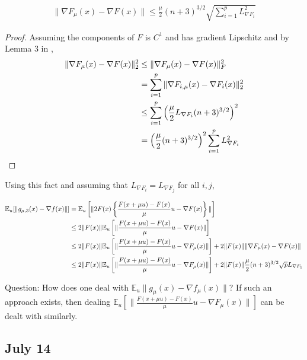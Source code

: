 \documentclass{article}
\begin{document}
\begin{theorem} \label{July_13_Theorem_grad_upper_bound}
\begin{align}
\|\nabla F_{\mu}(x) - \nabla F(x) \| \leq \frac{\mu}{2}(n+3)^{3/2}\sqrt{\sum_{i=1}^p L_{\nabla F_i}^2}
\end{align}
\begin{proof}
Assuming the components of $F$ is $C^1$ and has gradient Lipschitz and by Lemma $3$ in \cite{Nesterov2015},
\begin{align}
\|\nabla F_{\mu}(x) - \nabla F(x)\|_2^2 & \leq \|\nabla F_{\mu}(x) - \nabla F(x)\|_F^2 \notag \\ & = \sum_{i=1}^p \| \nabla F_{i,\mu}(x) - \nabla F_i(x)\|_2^2 \notag \\ & \leq \sum_{i=1}^p\left(\frac{\mu}{2}L_{\nabla F_i}(n+3)^{3/2}\right)^2 \notag \\ & = \left(\frac{\mu}{2}(n+3)^{3/2}\right)^2\sum_{i=1}^pL_{\nabla F_i}^2
\end{align}
\end{proof}
\end{theorem}

Using this fact and assuming that $L_{\nabla F_i} = L_{\nabla F_j}$ for all $i,j$,

\begin{align}
\mathbb{E}_u[\| g_{\mu,3}(x) - \nabla f(x)\|] & = \mathbb{E}_u\left[\|2F(x)\left\{\frac{F(x+\mu u) - F(x)}{\mu}u - \nabla F(x)\right\}\|\right] \notag \\ & \leq 2\|F(x)\| \mathbb{E}_u\left[\| \frac{F(x+\mu u) - F(x)}{\mu}u - \nabla F(x)\|\right] \notag \\ & \leq 2\| F(x)\|\mathbb{E}_u\left[\| \frac{F(x+\mu u) - F(x)}{\mu}u - \nabla F_{\mu}(x) \|\right] + 2\|F(x)\| \|\nabla F_{\mu}(x) - \nabla F(x)\| \notag \\ & \leq  2\| F(x)\|\mathbb{E}_u\left[\| \frac{F(x+\mu u) - F(x)}{\mu}u - \nabla F_{\mu}(x) \|\right] + 2\|F(x)\| \frac{\mu}{2}(n+3)^{3/2}\sqrt{p}L_{\nabla F_1} \label{sampling_error_2F_diff_quotient}
\end{align}

Question: How does one deal with $\mathbb{E}_u\|g_{\mu}(x) - \nabla f_{\mu}(x)\|$? If such an approach exists, then dealing $\mathbb{E}_u\left[\| \frac{F(x+\mu u)-F(x)}{\mu}u - \nabla F_{\mu}(x) \|\right]$ can be dealt with similarly. 

\subsection{July 14}
\end{document}

